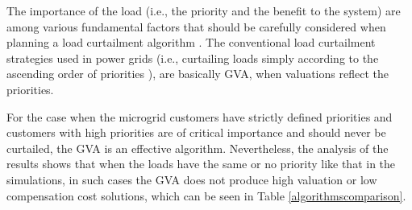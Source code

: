 The importance of the load (i.e.,  the priority and the benefit to the system) are among various fundamental factors that should be carefully considered when planning a load curtailment algorithm \cite{466502}. The conventional load curtailment strategies used in power grids (i.e., curtailing loads simply according to the ascending order of priorities \cite{5348255,6493097}), are basically {\sc GVA}, when valuations reflect the priorities.

For the case when the microgrid customers have strictly defined priorities and customers with high priorities are of critical importance and should never be curtailed, the {\sc GVA} is an effective algorithm. Nevertheless, the analysis of the results shows that when the loads have the same or no priority like that in the simulations, in such cases the {\sc GVA} does not produce high valuation or low compensation cost solutions, which can be seen in Table \ref{algorithmscomparison}.\\

 \vspace{-5pt}
